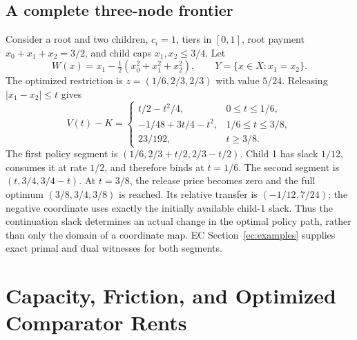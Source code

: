 \subsection{A complete three-node frontier}
Consider a root and two children, $c_i=1$, tiers in $[0,1]$, root payment $x_0+x_1+x_2=3/2$, and child caps $x_1,x_2\leq3/4$. Let
\[
 W(x)=x_1-\tfrac12(x_0^2+x_1^2+x_2^2),\qquad Y=\{x\in X:x_1=x_2\}.
\]
The optimized restriction is $z=(1/6,2/3,2/3)$ with value $5/24$. Releasing $|x_1-x_2|\leq t$ gives
\begin{equation}\label{eq:example-frontier}
 V(t)-K=
 \begin{cases}
 t/2-t^2/4,&0\leq t\leq1/6,\\
 -1/48+3t/4-t^2,&1/6\leq t\leq3/8,\\
 23/192,&t\geq3/8.
 \end{cases}
\end{equation}
The first policy segment is $(1/6,2/3+t/2,2/3-t/2)$. Child 1 has slack $1/12$, consumes it at rate $1/2$, and therefore binds at $t=1/6$. The second segment is $(t,3/4,3/4-t)$. At $t=3/8$, the release price becomes zero and the full optimum $(3/8,3/4,3/8)$ is reached. Its relative transfer is $(-1/12,7/24)$; the negative coordinate uses exactly the initially available child-1 slack. Thus the continuation slack determines an actual change in the optimal policy path, rather than only the domain of a coordinate map. EC Section~\ref{ec:examples} supplies exact primal and dual witnesses for both segments.

\section{Capacity, Friction, and Optimized Comparator Rents}\label{sec:rents}
